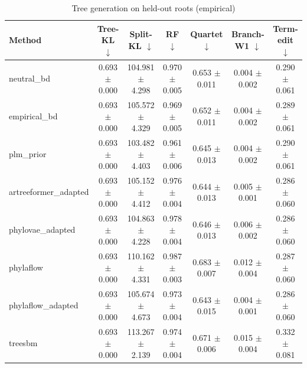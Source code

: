 \begin{table}[t]\centering
\caption{Tree generation on held-out roots (empirical)}
\begin{tabular}{lcccccc}
\toprule
Method & Tree-KL $\downarrow$ & Split-KL $\downarrow$ & RF $\downarrow$ & Quartet $\downarrow$ & Branch-W1 $\downarrow$ & Term-edit $\downarrow$ \\
\midrule
neutral\_bd & 0.693 $\pm$ 0.000 & 104.981 $\pm$ 4.298 & 0.970 $\pm$ 0.005 & 0.653 $\pm$ 0.011 & 0.004 $\pm$ 0.002 & 0.290 $\pm$ 0.061 \\
empirical\_bd & 0.693 $\pm$ 0.000 & 105.572 $\pm$ 4.329 & 0.969 $\pm$ 0.005 & 0.652 $\pm$ 0.011 & 0.004 $\pm$ 0.002 & 0.289 $\pm$ 0.061 \\
plm\_prior & 0.693 $\pm$ 0.000 & 103.482 $\pm$ 4.403 & 0.961 $\pm$ 0.006 & 0.645 $\pm$ 0.013 & 0.004 $\pm$ 0.002 & 0.290 $\pm$ 0.061 \\
artreeformer\_adapted & 0.693 $\pm$ 0.000 & 105.152 $\pm$ 4.412 & 0.976 $\pm$ 0.004 & 0.644 $\pm$ 0.013 & 0.005 $\pm$ 0.001 & 0.286 $\pm$ 0.060 \\
phylovae\_adapted & 0.693 $\pm$ 0.000 & 104.863 $\pm$ 4.228 & 0.978 $\pm$ 0.004 & 0.646 $\pm$ 0.013 & 0.006 $\pm$ 0.002 & 0.286 $\pm$ 0.060 \\
phylaflow & 0.693 $\pm$ 0.000 & 110.162 $\pm$ 4.331 & 0.987 $\pm$ 0.003 & 0.683 $\pm$ 0.007 & 0.012 $\pm$ 0.004 & 0.287 $\pm$ 0.060 \\
phylaflow\_adapted & 0.693 $\pm$ 0.000 & 105.674 $\pm$ 4.673 & 0.973 $\pm$ 0.004 & 0.643 $\pm$ 0.015 & 0.004 $\pm$ 0.001 & 0.286 $\pm$ 0.060 \\
treesbm & 0.693 $\pm$ 0.000 & 113.267 $\pm$ 2.139 & 0.974 $\pm$ 0.004 & 0.671 $\pm$ 0.006 & 0.015 $\pm$ 0.004 & 0.332 $\pm$ 0.081 \\
\bottomrule
\end{tabular}
\end{table}